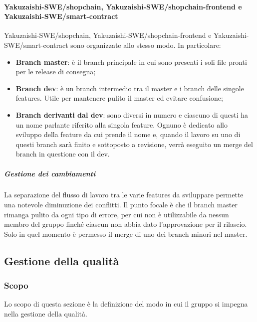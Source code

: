 \paragraph{Yakuzaishi-SWE/shopchain, Yakuzaishi-SWE/shopchain-frontend e
    \\ Yakuzaishi-SWE/smart-contract}
Yakuzaishi-SWE/shopchain, Yakuzaishi-SWE/shopchain-frontend\glo{} e Yakuzaishi-SWE/smart-contract\glo{} sono organizzate allo stesso modo. In particolare:
\begin{itemize}
    \item \textbf{Branch\glo{} master}: è il branch\glo{} principale in cui sono presenti i soli file pronti per le release di consegna;
    \item \textbf{Branch\glo{} dev}: è un branch\glo{} intermedio tra il master e i branch delle singole features. Utile per mantenere pulito il master ed evitare confusione;
    \item \textbf{Branch\glo{} derivanti dal dev}: sono diversi in numero e ciascuno di questi ha un nome parlante riferito alla singola feature. Ognuno è dedicato allo sviluppo della feature da cui prende il nome e, quando il lavoro su uno di questi branch\glo{} sarà finito e sottoposto a revisione, verrà eseguito un merge\glo{} del branch\glo{} in questione con il dev.
\end{itemize}

\subparagraph{Gestione dei cambiamenti}
La separazione del flusso di lavoro tra le varie features da sviluppare permette una notevole diminuzione dei conflitti. Il punto focale è che il branch\glo{} master rimanga pulito da ogni tipo di errore, per cui non è utilizzabile da nessun membro del gruppo finché ciascun \roleProjectManagerLow{} non abbia dato l'approvazione per il rilascio. Solo in quel momento è permesso il merge\glo{} di uno dei branch\glo{} minori nel master.

\vspace{2cm}

\subsection{Gestione della qualità}\label{subsection: gestione_qualita}
\subsubsection{Scopo}
Lo scopo di questa sezione è la definizione del modo in cui il gruppo si impegna nella gestione della qualità.
